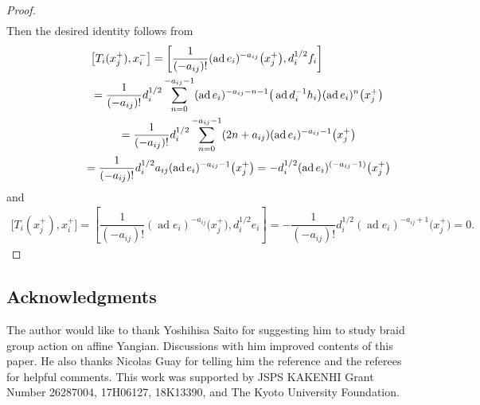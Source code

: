 \documentclass[10pt,a4paper]{amsart}
\theoremstyle{definition}
\numberwithin{equation}{section}
\DeclareMathOperator{\ad}{ad}
\begin{document}
\begin{proof}
\begin{gather*}
\end{gather*}
Then the desired identity follows from
\begin{gather*}
\big[T_i(x_j^+), x_i^-\big] = \left[\dfrac{1}{(-a_{ij})!} (\ad e_i)^{-a_{ij}}\big(x_j^+\big),d_i^{1/2} f_i\right]\\
\hphantom{\big[T_i(x_j^+), x_i^-\big]}{} = \dfrac{1}{(-a_{ij})!} d_i^{1/2} \sum_{n=0}^{-a_{ij}-1} (\ad e_i)^{-a_{ij}-n-1} \big(\ad d_i^{-1} h_i\big) (\ad e_i)^{n} \big(x_j^+\big) \\
\hphantom{\big[T_i(x_j^+), x_i^-\big]}{} = \dfrac{1}{(-a_{ij})!} d_i^{1/2} \sum_{n=0}^{-a_{ij}-1} (2n+a_{ij}) (\ad e_i)^{-a_{ij}-1} \big(x_j^+\big) \\
\hphantom{\big[T_i(x_j^+), x_i^-\big]}{} = \dfrac{1}{(-a_{ij})!} d_i^{1/2} a_{ij} (\ad e_i)^{-a_{ij}-1} \big(x_j^+\big)
 = -d_i^{1/2}(\ad e_i)^{(-a_{ij}-1)}\big(x_j^+\big)
\end{gather*}
and
\begin{gather*}
\big[T_i(x_j^+), x_i^+\big] = \left[\dfrac{1}{(-a_{ij})!} (\ad e_i)^{-a_{ij}}\big(x_j^+\big),d_i^{1/2} e_i\right] = -\dfrac{1}{(-a_{ij})!} d_i^{1/2} (\ad e_i)^{-a_{ij}+1}\big(x_j^+\big)=0.\!\!\!\!\tag*{\qed}
\end{gather*} \renewcommand{\qed}{}
\end{proof}

\subsection*{Acknowledgments}
The author would like to thank Yoshihisa Saito for suggesting him to study braid group action on affine Yangian. Discussions with him improved contents of this paper. He also thanks Nicolas Guay for telling him the reference \cite{MR1745710} and the referees for helpful comments. This work was supported by JSPS KAKENHI Grant Number 26287004, 17H06127, 18K13390, and The Kyoto University Foundation.

\end{document}
